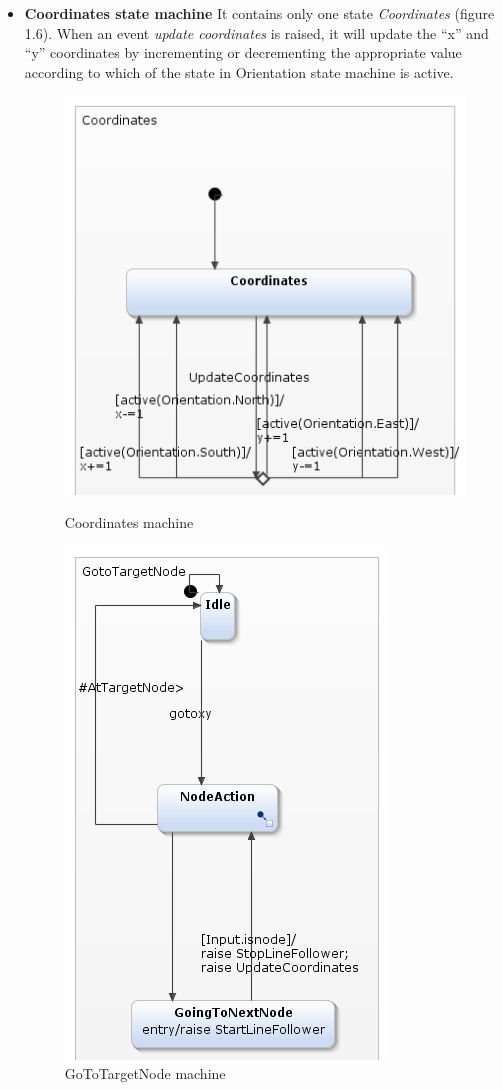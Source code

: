 \documentclass[a4paper,12pt,oneside]{book}
\begin{document}
\begin{itemize}
\item \textbf{Coordinates state machine}
It contains only one state \textit{Coordinates} (figure 1.6). When an event \textit{update coordinates} is raised, it will update the “x” and “y” coordinates by incrementing or decrementing the appropriate value according to which of the state in Orientation state machine is active.\pagebreak
	\begin{figure}[]
		\begin{minipage}{0.45\textwidth}
	\centering
	\includegraphics[scale=.6]{coordinates.png}
	\caption{Coordinates machine}
	\end{minipage}
\begin{minipage}{0.45\textwidth}
		\centering
	\includegraphics[scale=.6]{GoToTargetNode.png}
	\caption{GoToTargetNode machine}
	

\end{minipage}
\end{figure}
\end{itemize}
\end{document}
